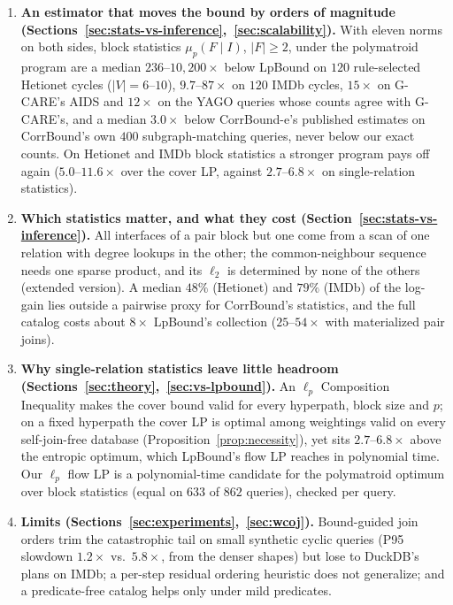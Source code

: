 \documentclass[conference]{IEEEtran}
\newcommand{\block}{F}
\newcommand{\interface}{I}
\begin{document}
\begin{enumerate}
\item \textbf{An estimator that moves the bound by orders of magnitude
(Sections~\ref{sec:stats-vs-inference},~\ref{sec:scalability}).}
With eleven norms on both sides, block statistics
$\mu_p(\block\mid\interface)$, $|\block|\ge2$, under the polymatroid
program are a median $236$--$10{,}200\times$ below LpBound on $120$
rule-selected Hetionet cycles ($|V|{=}6$--$10$), $9.7$--$87\times$ on
$120$ IMDb cycles, $15\times$ on G-CARE's AIDS and $12\times$ on the YAGO
queries whose counts agree with G-CARE's, and a median $3.0\times$
below CorrBound-e's published estimates on CorrBound's own $400$
subgraph-matching queries, never below our exact counts. On Hetionet and IMDb block
statistics a stronger program pays off again ($5.0$--$11.6\times$ over the
cover LP, against $2.7$--$6.8\times$ on single-relation statistics).

\item \textbf{Which statistics matter, and what they cost
(Section~\ref{sec:stats-vs-inference}).}
All interfaces of a pair block but one come from a scan of one relation
with degree lookups in the other; the common-neighbour sequence needs one
sparse product, and its $\ell_2$ is determined by none of the others
(extended version). A median $48\%$ (Hetionet) and $79\%$ (IMDb) of the
log-gain lies outside a pairwise proxy for CorrBound's statistics, and the
full catalog costs about $8\times$ LpBound's collection ($25$--$54\times$
with materialized pair joins).

\item \textbf{Why single-relation statistics leave little headroom
(Sections~\ref{sec:theory},~\ref{sec:vs-lpbound}).}
An $\ell_p$ Composition Inequality makes the cover bound valid for every
hyperpath, block size and $p$; on a fixed hyperpath the cover LP is optimal
among weightings valid on every self-join-free database
(Proposition~\ref{prop:necessity}), yet sits $2.7$--$6.8\times$ above the
entropic optimum, which LpBound's flow LP reaches in polynomial time. Our
$\ell_p$ flow LP is a polynomial-time candidate for the polymatroid
optimum over block statistics (equal on $633$ of $862$ queries), checked
per query.

\item \textbf{Limits (Sections~\ref{sec:experiments},~\ref{sec:wcoj}).}
Bound-guided join orders trim the catastrophic tail on small synthetic
cyclic queries (P95 slowdown $1.2\times$ vs.\ $5.8\times$, from the denser
shapes) but lose to DuckDB's plans on IMDb; a per-step residual ordering
heuristic does not generalize; and a predicate-free catalog helps only
under mild predicates.
\end{enumerate}
\end{document}
